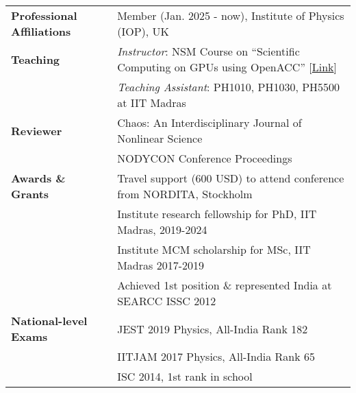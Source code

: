 \begin{longtable}[l]{@{} m{4.75cm} m{13cm}}

\textbf{Professional Affiliations} & Member (Jan. 2025 - now), Institute of Physics (IOP), UK\\[0.3cm]

\textbf{Teaching} & \textit{Instructor}: NSM Course on ``Scientific Computing on GPUs using OpenACC'' [\href{https://www.cse.iitm.ac.in/~rupesh/events/openacc23/}{Link}]\\ 
& \textit{Teaching Assistant}: PH1010, PH1030, PH5500 at IIT Madras\\[0.3cm]

\textbf{Reviewer} & Chaos: An Interdisciplinary Journal of Nonlinear Science \\
                                    & NODYCON Conference Proceedings \\ [0.3cm]

\textbf{Awards \& Grants} & Travel support (600 USD) to attend conference from NORDITA, Stockholm\\
                                         & Institute research fellowship for PhD, IIT Madras, 2019-2024\\
                                         & Institute MCM scholarship for MSc, IIT Madras 2017-2019\\
                                         & Achieved 1st position \& represented India at SEARCC ISSC 2012\\[0.3cm]

\textbf{National-level Exams} & JEST 2019 Physics, All-India Rank 182\\
                                                & IITJAM 2017 Physics, All-India Rank 65\\
                                                & ISC 2014, 1st rank in school
\end{longtable}